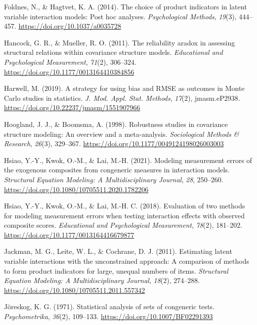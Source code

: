 \documentclass[
  man]{apa6}
\newlength{\cslhangindent}
\newenvironment{CSLReferences}[2] %
 {\begin{list}{}{%
  \setlength{\itemindent}{0pt}
  \setlength{\leftmargin}{0pt}
  \setlength{\parsep}{0pt}
  \ifodd #1
   \setlength{\leftmargin}{\cslhangindent}
   \setlength{\itemindent}{-1\cslhangindent}
  \fi
  \setlength{\itemsep}{#2\baselineskip}}}
 {\end{list}}
\begin{document}
\begin{CSLReferences}{1}{0}
Foldnes, N., \& Hagtvet, K. A. (2014). The choice of product indicators in latent variable interaction models: {Post} hoc analyses. \emph{Psychological Methods}, \emph{19}(3), 444--457. \url{https://doi.org/10.1037/a0035728}

Hancock, G. R., \& Mueller, R. O. (2011). The reliability aradox in assessing structural relations within covariance structure models. \emph{Educational and Psychological Measurement}, \emph{71}(2), 306--324. \url{https://doi.org/10.1177/0013164410384856}

Harwell, M. (2019). A strategy for using bias and {RMSE} as outcomes in {Monte Carlo} studies in statistics. \emph{J. Mod. Appl. Stat. Methods}, \emph{17}(2), jmasm.eP2938. \url{https://doi.org/10.22237/jmasm/1551907966}

Hoogland, J. J., \& Boomsma, A. (1998). Robustness studies in covariance structure modeling: {An} overview and a meta-analysis. \emph{Sociological Methods \& Research}, \emph{26}(3), 329--367. \url{https://doi.org/10.1177/0049124198026003003}

Hsiao, Y.-Y., Kwok, O.-M., \& Lai, M.-H. (2021). Modeling measurement errors of the exogenous composites from congeneric measures in interaction models. \emph{Structural Equation Modeling: A Multidisciplinary Journal}, \emph{28}, 250--260. \url{https://doi.org/10.1080/10705511.2020.1782206}

Hsiao, Y.-Y., Kwok, O.-M., \& Lai, M.-H. C. (2018). Evaluation of two methods for modeling measurement errors when testing interaction effects with observed composite scores. \emph{Educational and Psychological Measurement}, \emph{78}(2), 181--202. \url{https://doi.org/10.1177/0013164416679877}

Jackman, M. G., Leite, W. L., \& Cochrane, D. J. (2011). Estimating latent variable interactions with the unconstrained approach: A comparison of methods to form product indicators for large, unequal numbers of items. \emph{Structural Equation Modeling: A Multidisciplinary Journal}, \emph{18}(2), 274--288. \url{https://doi.org/10.1080/10705511.2011.557342}

Jöreskog, K. G. (1971). Statistical analysis of sets of congeneric tests. \emph{Psychometrika}, \emph{36}(2), 109--133. \url{https://doi.org/10.1007/BF02291393}


\end{CSLReferences}
\end{document}
